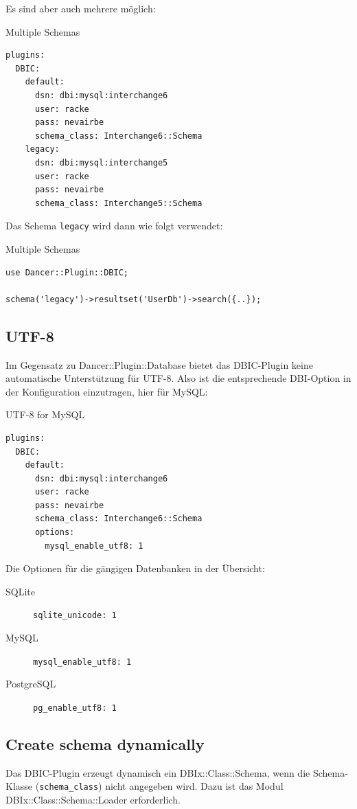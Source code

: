 Es sind aber auch mehrere möglich:

\begin{frame}[fragile]{Multiple Schemas}
\begin{lstlisting}
plugins:
  DBIC:
    default:
      dsn: dbi:mysql:interchange6
      user: racke
      pass: nevairbe
      schema_class: Interchange6::Schema
    legacy:
      dsn: dbi:mysql:interchange5
      user: racke
      pass: nevairbe
      schema_class: Interchange5::Schema
\end{lstlisting}
\end{frame}

Das Schema \verb|legacy| wird dann wie folgt verwendet:

\begin{frame}[fragile]{Multiple Schemas}
\begin{lstlisting}
use Dancer::Plugin::DBIC;

schema('legacy')->resultset('UserDb')->search({..});
\end{lstlisting}
\end{frame}

\subsection{UTF-8}
Im Gegensatz zu Dancer::Plugin::Database bietet das DBIC-Plugin
keine automatische Unterstützung für UTF-8. Also ist die entsprechende
DBI-Option in der Konfiguration einzutragen, hier für MySQL:
\begin{frame}[fragile]{UTF-8 for MySQL}
\begin{lstlisting}
plugins:
  DBIC:
    default:
      dsn: dbi:mysql:interchange6
      user: racke
      pass: nevairbe
      schema_class: Interchange6::Schema
      options:
        mysql_enable_utf8: 1
\end{lstlisting}
\end{frame}

Die Optionen für die gängigen Datenbanken in der Übersicht:

\begin{description}
\item[SQLite] \verb|sqlite_unicode: 1|
\item[MySQL] \verb|mysql_enable_utf8: 1|
\item[PostgreSQL] \verb|pg_enable_utf8: 1| 
\end{description}

\subsection{Create schema dynamically}
Das DBIC-Plugin erzeugt dynamisch ein DBIx::Class::Schema, wenn
die Schema-Klasse (\verb|schema_class|) nicht angegeben wird.
Dazu ist das Modul DBIx::Class::Schema::Loader erforderlich.

